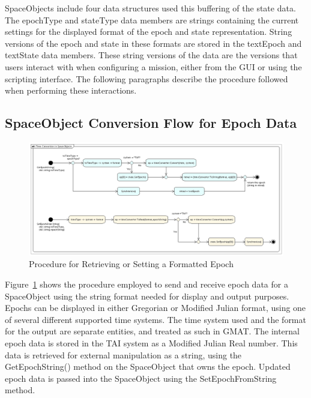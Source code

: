 SpaceObjects include four data structures used this buffering of the state data.  The epochType and
stateType data members are strings containing the current settings for the displayed format of the
epoch and state representation.  String versions of the epoch and state in these formats are stored
in the textEpoch and textState data members.  These string versions of the data are the versions
that users interact with when configuring a mission, either from the GUI or using the scripting
interface.  The following paragraphs describe the procedure followed when performing these
interactions.

\subsection{SpaceObject Conversion Flow for Epoch Data}

\begin{figure}
\begin{center}
\includegraphics[430,186]{Images/TimeConversioninSpaceObjects.png}
\caption{\label{figure:TimeConversion}Procedure for Retrieving or Setting a Formatted Epoch}
\end{center}
\end{figure}

Figure~\ref{figure:TimeConversion} shows the procedure employed to send and receive epoch data for a
SpaceObject using the string format needed for display and output purposes.  Epochs can be
displayed in either Gregorian or Modified Julian format, using one of several different supported
time systems.  The time system used and the format for the output are separate entities, and
treated as such in GMAT.  The internal epoch data is stored in the TAI system as a Modified Julian
Real number.  This data is retrieved for external manipulation as a string, using the
GetEpochString() method on the SpaceObject that owns the epoch.  Updated epoch data is passed into
the SpaceObject using the SetEpochFromString method.

